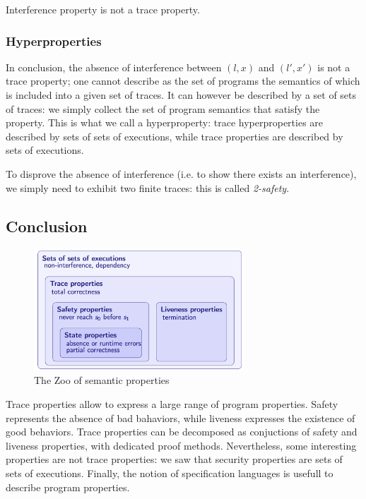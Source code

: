 \documentclass[toc, titlepaged]{../cs-classes/cs-classes}
\begin{document}
\begin{property}
    Interference property is not a trace property.
\end{property}

\subsubsection{Hyperproperties}
In conclusion, the absence of interference between $(l, x)$ and $(l', x')$ is not a trace property; one cannot describe as the set of programs the semantics of which is included into a given set of traces. It can however be described by a set of sets of traces: we simply collect the set of program semantics that satisfy the property. This is what we call a hyperproperty: trace hyperproperties are described by sets of sets of executions, while trace properties are described by sets of executions.

To disprove the absence of interference (i.e. to show there exists an interference), we simply need to exhibit two finite traces: this is called \emph{2-safety}.

\subsection{Conclusion}
\begin{figure}[H]
    \centering
    \includegraphics[width=0.7\textwidth]{images/semantic-properties.png}
    \caption{The Zoo of semantic properties}
\end{figure}

Trace properties allow to express a large range of program properties. Safety represents the absence of bad bahaviors, while liveness expresses the existence of good behaviors. Trace properties can be decomposed as conjuctions of safety and liveness properties, with dedicated proof methods. Nevertheless, some interesting properties are not trace properties: we saw that security properties are sets of sets of executions. Finally, the notion of specification languages is usefull to describe program properties.
\end{document}
